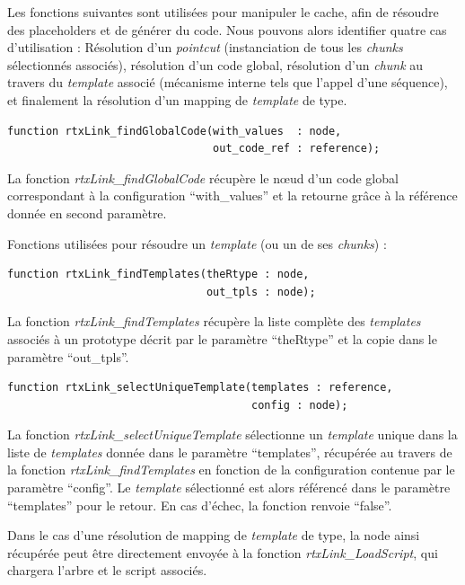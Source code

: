 \documentclass[french]{rtxreport}
\begin{document}
\vspace{20pt}

Les fonctions suivantes sont utilisées pour manipuler le cache, afin de
résoudre des placeholders et de générer du code. Nous pouvons alors identifier
quatre cas d'utilisation : Résolution d'un \emph{pointcut} (instanciation de
tous les \emph{chunks} sélectionnés associés), résolution d'un code global,
résolution d'un \emph{chunk} au travers du \emph{template} associé (mécanisme
interne tels que l'appel d'une séquence), et finalement la résolution d'un
mapping de \emph{template} de type.

\begin{lstlisting}
function rtxLink_findGlobalCode(with_values  : node,
                                out_code_ref : reference);
\end{lstlisting}
La fonction \emph{rtxLink\_findGlobalCode} récupère le nœud d'un code global
correspondant à la configuration ``with\_values'' et la retourne grâce à la
référence donnée en second paramètre.

\vspace{20pt}

Fonctions utilisées pour résoudre un \emph{template} (ou un de ses \emph{chunks}) :
\begin{lstlisting}
function rtxLink_findTemplates(theRtype : node,
                               out_tpls : node);
\end{lstlisting}
La fonction \emph{rtxLink\_findTemplates} récupère la liste complète des
\emph{templates} associés à un prototype décrit par le paramètre ``theRtype''
et la copie dans le paramètre ``out\_tpls''.

\begin{lstlisting}
function rtxLink_selectUniqueTemplate(templates : reference,
                                      config : node);
\end{lstlisting}
La fonction \emph{rtxLink\_selectUniqueTemplate} sélectionne un \emph{template}
unique dans la liste de \emph{templates} donnée dans le paramètre ``templates'',
récupérée au travers de la fonction \emph{rtxLink\_findTemplates} en fonction
de la configuration contenue par le paramètre ``config''. Le \emph{template}
sélectionné est alors référencé dans le paramètre ``templates'' pour le retour.
En cas d'échec, la fonction renvoie ``false''.

Dans le cas d'une résolution de mapping de \emph{template} de type, la node ainsi
récupérée peut être directement envoyée à la fonction
\emph{rtxLink\_LoadScript}, qui chargera l'arbre et le script associés.
\end{document}
